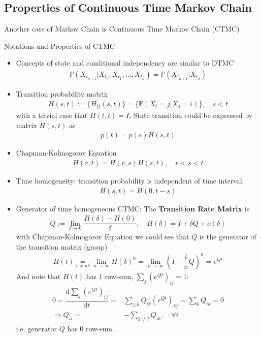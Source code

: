 \subsection{Properties of Continuous Time Markov Chain}\label{SubSubSectionCTMC}
Another case of Markov Chain is Continuous Time Markov Chain (CTMC)

\begin{point}
    Notations and Properties of CTMC
\end{point}
\begin{itemize}[topsep=2pt,itemsep=0pt]
    \item Concepts of state and conditional independency are similar to DTMC
    \begin{align}
         \mathbb{P}\left( X_{t_{n+1}}\big|X_{t_0},X_{t_1},\ldots,X_{t_{n}} \right)=\mathbb{P}\left( X_{t_{n+1}}\big| X_{t_n} \right)  
    \end{align}
    \item Transition probability matrix
    \begin{align}
         H(s,t):=\{H_{ij}(s,t)\}=\{\mathbb{P}\left( X_{t}=j|X_{s}=i \right) \},\quad s<t
    \end{align}
    with a trivial case that $ H(t,t)=I $. State transition could be expressed by matrix $ H(s,t) $ as
    \begin{align}
        p(t)=p(s)H(s,t)
    \end{align}
    
    \item Chapman-Kolmogorov Equation
    \begin{align}
        H(r,t)=H(r,s)H(s,t),\quad r<s<t 
    \end{align}
    \item Time homogeneity: transition probability is independent of time interval:
    \begin{align}
        H(s,t)=H(0,t-s) 
    \end{align}
    \item Generator of time homogeneous CTMC: The \textbf{Transition Rate Matrix} is 
    \begin{align}
        Q:=\lim_{\delta \to 0}\dfrac{H(\delta )-H(0)}{\delta },\quad H(\delta )=I+\delta Q+o(\delta ) 
    \end{align}
    with Chapman-Kolmogorov Equation we could see that $ Q $ is the generator of the transition matrix (group)
    \begin{align}
        H(t)\mathop{=}\limits_{t=n\delta }\lim_{n\to\infty}H(\delta )^n=\lim_{n\to\infty}\left(I+\dfrac{t}{n}Q\right)^{n}=e^{Qt}  
    \end{align}
    And note that $ H(t) $ has 1 row-sum, $ \sum_{j}\left(e^{Qt}\right)_{ij}=1 $:
    \begin{align}
        0=\dfrac{\mathrm{d}\sum_{j}\left(e^{Qt}\right)_{ij}}{\mathrm{d}t^{}}=&\sum_{j,k}Q_{ik} \left(e^{Qt}\right)_{kj}=\sum_{k}Q_{ik}=0\\
        \Rightarrow Q_{ii}=&-\sum_{k\neq i}Q_{ik},\quad \forall i
    \end{align}
    i.e. generator $ Q $ has 0 row-sum.


\end{itemize}
